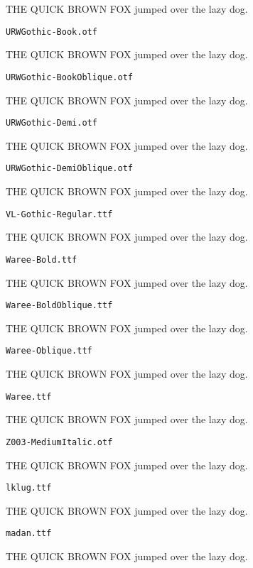 \documentclass{article}
\begin{document}
THE QUICK BROWN FOX jumped over the lazy dog.

\setmainfont[Extension=.otf]{URWGothic-Book}
\noindent \verb!URWGothic-Book.otf!

THE QUICK BROWN FOX jumped over the lazy dog.

\setmainfont[Extension=.otf]{URWGothic-BookOblique}
\noindent \verb!URWGothic-BookOblique.otf!

THE QUICK BROWN FOX jumped over the lazy dog.

\setmainfont[Extension=.otf]{URWGothic-Demi}
\noindent \verb!URWGothic-Demi.otf!

THE QUICK BROWN FOX jumped over the lazy dog.

\setmainfont[Extension=.otf]{URWGothic-DemiOblique}
\noindent \verb!URWGothic-DemiOblique.otf!

THE QUICK BROWN FOX jumped over the lazy dog.

\setmainfont[Extension=.ttf]{VL-Gothic-Regular}
\noindent \verb!VL-Gothic-Regular.ttf!

THE QUICK BROWN FOX jumped over the lazy dog.

\setmainfont[Extension=.ttf]{Waree-Bold}
\noindent \verb!Waree-Bold.ttf!

THE QUICK BROWN FOX jumped over the lazy dog.

\setmainfont[Extension=.ttf]{Waree-BoldOblique}
\noindent \verb!Waree-BoldOblique.ttf!

THE QUICK BROWN FOX jumped over the lazy dog.

\setmainfont[Extension=.ttf]{Waree-Oblique}
\noindent \verb!Waree-Oblique.ttf!

THE QUICK BROWN FOX jumped over the lazy dog.

\setmainfont[Extension=.ttf]{Waree}
\noindent \verb!Waree.ttf!

THE QUICK BROWN FOX jumped over the lazy dog.

\setmainfont[Extension=.otf]{Z003-MediumItalic}
\noindent \verb!Z003-MediumItalic.otf!

THE QUICK BROWN FOX jumped over the lazy dog.

\setmainfont[Extension=.ttf]{lklug}
\noindent \verb!lklug.ttf!

THE QUICK BROWN FOX jumped over the lazy dog.

\setmainfont[Extension=.ttf]{madan}
\noindent \verb!madan.ttf!

THE QUICK BROWN FOX jumped over the lazy dog.
\end{document}
